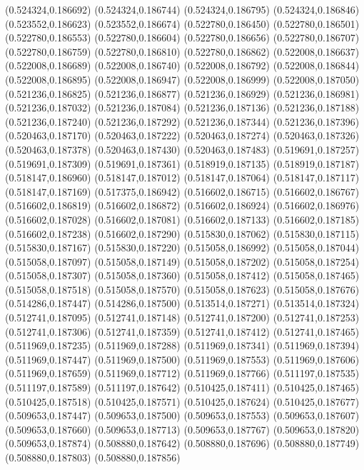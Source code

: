 (0.524324,0.186692)
(0.524324,0.186744)
(0.524324,0.186795)
(0.524324,0.186846)
(0.523552,0.186623)
(0.523552,0.186674)
(0.522780,0.186450)
(0.522780,0.186501)
(0.522780,0.186553)
(0.522780,0.186604)
(0.522780,0.186656)
(0.522780,0.186707)
(0.522780,0.186759)
(0.522780,0.186810)
(0.522780,0.186862)
(0.522008,0.186637)
(0.522008,0.186689)
(0.522008,0.186740)
(0.522008,0.186792)
(0.522008,0.186844)
(0.522008,0.186895)
(0.522008,0.186947)
(0.522008,0.186999)
(0.522008,0.187050)
(0.521236,0.186825)
(0.521236,0.186877)
(0.521236,0.186929)
(0.521236,0.186981)
(0.521236,0.187032)
(0.521236,0.187084)
(0.521236,0.187136)
(0.521236,0.187188)
(0.521236,0.187240)
(0.521236,0.187292)
(0.521236,0.187344)
(0.521236,0.187396)
(0.520463,0.187170)
(0.520463,0.187222)
(0.520463,0.187274)
(0.520463,0.187326)
(0.520463,0.187378)
(0.520463,0.187430)
(0.520463,0.187483)
(0.519691,0.187257)
(0.519691,0.187309)
(0.519691,0.187361)
(0.518919,0.187135)
(0.518919,0.187187)
(0.518147,0.186960)
(0.518147,0.187012)
(0.518147,0.187064)
(0.518147,0.187117)
(0.518147,0.187169)
(0.517375,0.186942)
(0.516602,0.186715)
(0.516602,0.186767)
(0.516602,0.186819)
(0.516602,0.186872)
(0.516602,0.186924)
(0.516602,0.186976)
(0.516602,0.187028)
(0.516602,0.187081)
(0.516602,0.187133)
(0.516602,0.187185)
(0.516602,0.187238)
(0.516602,0.187290)
(0.515830,0.187062)
(0.515830,0.187115)
(0.515830,0.187167)
(0.515830,0.187220)
(0.515058,0.186992)
(0.515058,0.187044)
(0.515058,0.187097)
(0.515058,0.187149)
(0.515058,0.187202)
(0.515058,0.187254)
(0.515058,0.187307)
(0.515058,0.187360)
(0.515058,0.187412)
(0.515058,0.187465)
(0.515058,0.187518)
(0.515058,0.187570)
(0.515058,0.187623)
(0.515058,0.187676)
(0.514286,0.187447)
(0.514286,0.187500)
(0.513514,0.187271)
(0.513514,0.187324)
(0.512741,0.187095)
(0.512741,0.187148)
(0.512741,0.187200)
(0.512741,0.187253)
(0.512741,0.187306)
(0.512741,0.187359)
(0.512741,0.187412)
(0.512741,0.187465)
(0.511969,0.187235)
(0.511969,0.187288)
(0.511969,0.187341)
(0.511969,0.187394)
(0.511969,0.187447)
(0.511969,0.187500)
(0.511969,0.187553)
(0.511969,0.187606)
(0.511969,0.187659)
(0.511969,0.187712)
(0.511969,0.187766)
(0.511197,0.187535)
(0.511197,0.187589)
(0.511197,0.187642)
(0.510425,0.187411)
(0.510425,0.187465)
(0.510425,0.187518)
(0.510425,0.187571)
(0.510425,0.187624)
(0.510425,0.187677)
(0.509653,0.187447)
(0.509653,0.187500)
(0.509653,0.187553)
(0.509653,0.187607)
(0.509653,0.187660)
(0.509653,0.187713)
(0.509653,0.187767)
(0.509653,0.187820)
(0.509653,0.187874)
(0.508880,0.187642)
(0.508880,0.187696)
(0.508880,0.187749)
(0.508880,0.187803)
(0.508880,0.187856)
